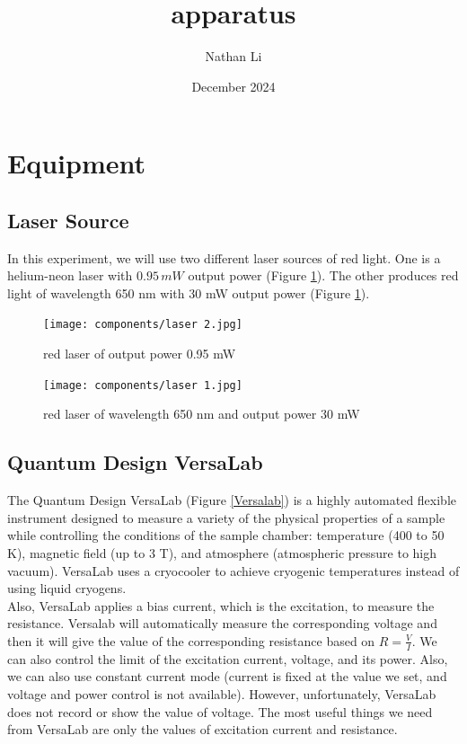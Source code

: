 \documentclass{article}
\title{apparatus}
\author{Nathan Li}
\date{December 2024}
\begin{document}
\maketitle

\section{Equipment}
    
    \subsection{Laser Source}
        In this experiment, we will use two different laser sources of red light. One is a helium-neon laser with $0.95\,mW$ output power (Figure \ref{laser2}). The other produces red light of wavelength 650 nm with 30 mW output power (Figure \ref{laser2}).

        \begin{figure}[H]
        \centering
        \texttt{[image: components/laser 2.jpg]}
        \caption{red laser of output power 0.95 mW}
        \label{laser2}
        \end{figure}

         \begin{figure}[H]
        \centering
        \texttt{[image: components/laser 1.jpg]}
        \caption{red laser of wavelength 650 nm and output power 30 mW}
        \label{laser1}
        \end{figure}

    \subsection{Quantum Design VersaLab}
        The Quantum Design VersaLab (Figure \ref{Versalab}) is a highly automated flexible instrument designed to measure a variety of the physical properties of a sample while controlling the conditions of the sample chamber: temperature (400 to 50 K), magnetic field (up to 3 T), and atmosphere (atmospheric pressure to high vacuum). VersaLab uses a cryocooler to achieve cryogenic temperatures instead of using liquid cryogens.\\
        Also, VersaLab applies a bias current, which is the excitation, to measure the resistance. Versalab will automatically measure the corresponding voltage and then it will give the value of the corresponding resistance based on $R=\frac{V}{I}$. We can also control the limit of the excitation current, voltage, and its power. Also, we can also use constant current mode (current is fixed at the value we set, and voltage and power control is not available). However, unfortunately, VersaLab does not record or show the value of voltage. The most useful things we need from VersaLab are only the values of excitation current and resistance.
\end{document}
